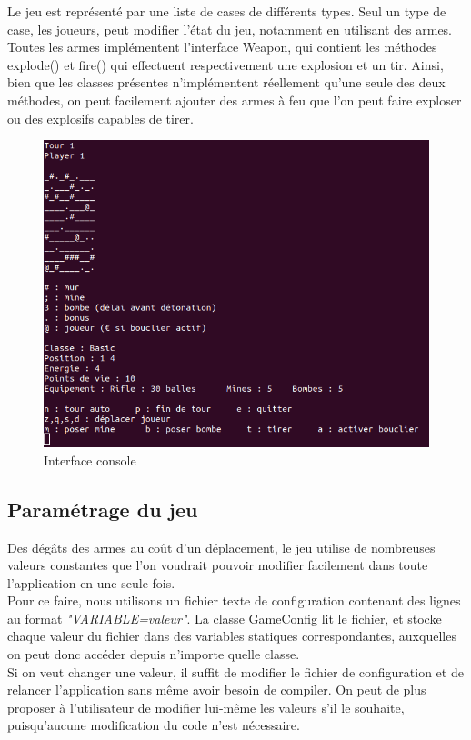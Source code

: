 \documentclass[a4paper,12pt]{article} %
\begin{document}
Le jeu est représenté par une liste de cases de différents types. Seul un type de case, les joueurs, peut modifier l'état du jeu, notamment en utilisant des armes.\\
Toutes les armes implémentent l'interface Weapon, qui contient les méthodes explode() et fire() qui effectuent respectivement une explosion et un tir. Ainsi, bien que les classes présentes n'implémentent réellement qu'une seule des deux méthodes, on peut facilement ajouter des armes à feu que l'on peut faire exploser ou des explosifs capables de tirer.\\

\begin{figure}[!h]
\centering
\includegraphics[scale=0.5]{images/game.png}
\caption{Interface console}
\end{figure}

\subsection{Paramétrage du jeu}

Des dégâts des armes au coût d'un déplacement, le jeu utilise de nombreuses valeurs constantes que l'on voudrait pouvoir modifier facilement dans toute l'application en une seule fois.\\
Pour ce faire, nous utilisons un fichier texte de configuration contenant des lignes au format \textit{"VARIABLE=valeur"}. La classe GameConfig lit le fichier, et stocke chaque valeur du fichier dans des variables statiques correspondantes, auxquelles on peut donc accéder depuis n'importe quelle classe.\\
Si on veut changer une valeur, il suffit de modifier le fichier de configuration et de relancer l'application sans même avoir besoin de compiler. On peut de plus proposer à l'utilisateur de modifier lui-même les valeurs s'il le souhaite, puisqu'aucune modification du code n'est nécessaire.
\end{document}
